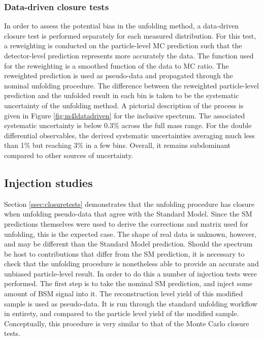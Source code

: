 \subsubsection{Data-driven closure tests}
\label{sssec:datadrivenclosure}
In order to assess the potential bias in the unfolding method, a data-driven closure test is performed separately for each measured distribution. For this test, a reweighting is conducted on the particle-level MC prediction such that the detector-level prediction represents more accurately the data. The function used for the reweighting is a smoothed function of the data to MC ratio. The reweighted prediction is used as pseudo-data and propagated through the nominal unfolding procedure. The difference between the reweighted particle-level prediction and the unfolded result in each bin is taken to be the systematic uncertainty of the unfolding method. A pictorial description of the process is given in Figure \ref{fig:m4ldatadriven} for the inclusive \mFourL{} spectrum. The associated systematic uncertainty is below 0.3\% across the full mass range. For the double differential observables, the derived systematic uncertainties averaging much less than 1\% but reaching 3\% in a few bins. Overall, it remains subdominant compared to other sources of uncertainty.

\subsection{Injection studies}
\label{ssec:injectiontests}
Section \ref{ssec:closuretests} demonstrates that the unfolding procedure has closure when unfolding pseudo-data that agree with the Standard Model. Since the SM predictions themselves were used to derive the corrections and matrix used for unfolding, this is the expected case. The shape of real data is unknown, however, and may be different than the Standard Model prediction. Should the \mFourL{} spectrum be host to contributions that differ from the SM prediction, it is necessary to check that the unfolding procedure is nonetheless able to provide an accurate and unbiased particle-level result. In order to do this a number of injection tests were performed. The first step is to take the nominal SM prediction, and inject some amount of BSM signal into it. The reconstruction level yield of this modified sample is used as pseudo-data. It is run through the standard unfolding workflow in entirety, and compared to the particle level yield of the modified sample. Conceptually, this procedure is very similar to that of the Monte Carlo closure tests. 

